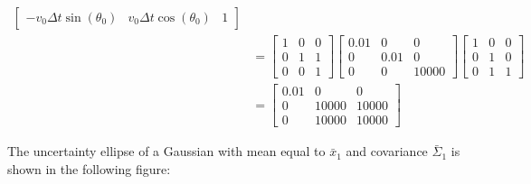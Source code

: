 \documentclass[answers]{exam}
\begin{document}
\begin{questions}
\begin{parts}
\begin{solution}
\begin{align*}
\begin{bmatrix}
                                                                     -v_0 \Delta t \sin(\theta_0) & v_0 \Delta t \cos(\theta_0) & 1
                                                                 \end{bmatrix} \\
                                 & = \begin{bmatrix}
                                         1 & 0 & 0 \\
                                         0 & 1 & 1 \\
                                         0 & 0 & 1
                                     \end{bmatrix} \begin{bmatrix}
                                                       0.01 & 0    & 0     \\
                                                       0    & 0.01 & 0     \\
                                                       0    & 0    & 10000
                                                   \end{bmatrix} \begin{bmatrix}
                                                                     1 & 0 & 0 \\
                                                                     0 & 1 & 0 \\
                                                                     0 & 1 & 1
                                                                 \end{bmatrix}                                                 \\
                                 & = \begin{bmatrix}
                                         0.01 & 0     & 0     \\
                                         0    & 10000 & 10000 \\
                                         0    & 10000 & 10000
                                     \end{bmatrix}
            \end{align*}

            The uncertainty ellipse of a Gaussian with mean equal to \(\bar{x}_1\) and
            covariance \(\bar{\Sigma}_1\) is shown in the following figure:
        \end{solution}


\end{parts}
\end{questions}
\end{document}
